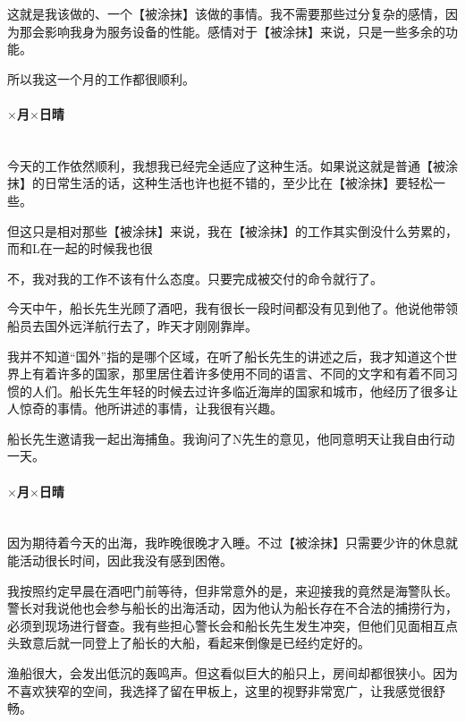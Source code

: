 这就是我该做的、一个【被涂抹】该做的事情。我不需要那些过分复杂的感情，因为那会影响我身为服务设备的性能。感情对于【被涂抹】来说，只是一些多余的功能。

所以我这一个月的工作都很顺利。

\par

\paragraph*{$\times$月$\times$日\quad 晴}\mbox{}\\

今天的工作依然顺利，我想我已经完全适应了这种生活。如果说这就是普通【被涂抹】的日常生活的话，这种生活也许也挺不错的，至少比在【被涂抹】要轻松一些。

但这只是相对那些【被涂抹】来说，我在【被涂抹】的工作其实倒没什么劳累的，而和L在一起的时候我也很

不，我对我的工作不该有什么态度。只要完成被交付的命令就行了。

今天中午，船长先生光顾了酒吧，我有很长一段时间都没有见到他了。他说他带领船员去国外远洋航行去了，昨天才刚刚靠岸。

我并不知道“国外”指的是哪个区域，在听了船长先生的讲述之后，我才知道这个世界上有着许多的国家，那里居住着许多使用不同的语言、不同的文字和有着不同习惯的人们。船长先生年轻的时候去过许多临近海岸的国家和城市，他经历了很多让人惊奇的事情。他所讲述的事情，让我很有兴趣。

船长先生邀请我一起出海捕鱼。我询问了N先生的意见，他同意明天让我自由行动一天。

\par

\paragraph*{$\times$月$\times$日\quad 晴}\mbox{}\\

因为期待着今天的出海，我昨晚很晚才入睡。不过【被涂抹】只需要少许的休息就能活动很长时间，因此我没有感到困倦。

我按照约定早晨在酒吧门前等待，但非常意外的是，来迎接我的竟然是海警队长。警长对我说他也会参与船长的出海活动，因为他认为船长存在不合法的捕捞行为，必须到现场进行督查。我有些担心警长会和船长先生发生冲突，但他们见面相互点头致意后就一同登上了船长的大船，看起来倒像是已经约定好的。

渔船很大，会发出低沉的轰鸣声。但这看似巨大的船只上，房间却都很狭小。因为不喜欢狭窄的空间，我选择了留在甲板上，这里的视野非常宽广，让我感觉很舒畅。

